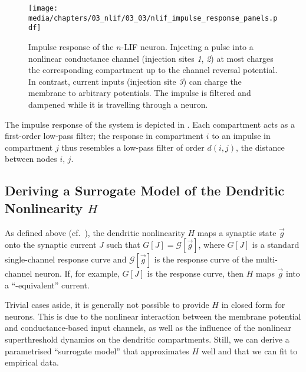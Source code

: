 \begin{figure}
	\texttt{[image: media/chapters/03\_nlif/03\_03/nlif\_impulse\_response\_panels.pdf]}
	\caption[Impulse response of the $n$-LIF neuron]{Impulse response of the $n$-LIF neuron.
	Injecting a pulse into a nonlinear conductance channel (injection sites \emph{1}, \emph{2}) at most charges the corresponding compartment up to the channel reversal potential.
	In contrast, current inputs (injection site \emph{3}) can charge the membrane to arbitrary potentials.
	The impulse is filtered and dampened while it is travelling through a neuron.
	}
	\label{fig:nlif_impulse_response_panels}
\end{figure}
The impulse response of the system is depicted in .
Each compartment acts as a first-order low-pass filter; the response in compartment $i$ to an impulse in compartment $j$ thus resembles a low-pass filter of order $d(i, j)$, the distance between nodes $i$, $j$.

\subsection{Deriving a Surrogate Model of the Dendritic Nonlinearity $H$}
\label{sec:nlif_derive_h}

As defined above (cf.~), the dendritic nonlinearity $H$ maps a synaptic state $\vec g$ onto the synaptic current $J$ such that $G[J] = \mathscr{G}[\vec g]$, where $G[J]$ is a standard single-channel response curve and $\mathscr{G}[\vec g]$ is the response curve of the multi-channel neuron.
If, for example, $G[J]$ is the \LIF response curve, then $H$ maps $\vec g$ into a \enquote{\LIF-equivalent} current.

Trivial cases aside, it is generally not possible to provide $H$ in closed form for \nlif neurons.
This is due to the nonlinear interaction between the membrane potential and conductance-based input channels, as well as the influence of the nonlinear superthreshold dynamics on the dendritic compartments.
Still, we can derive a parametrised \enquote{surrogate model} that approximates $H$ well and that we can fit to empirical data.

